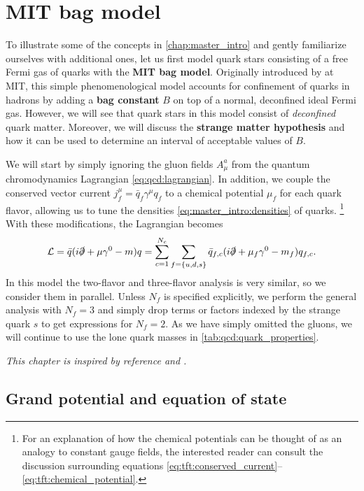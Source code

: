 \chapter{MIT bag model}
\label{chap:mit}

To illustrate some of the concepts in \cref{chap:master_intro} and gently familiarize ourselves with additional ones,
let us first model quark stars consisting of a free Fermi gas of quarks with the \textbf{MIT bag model}.
Originally introduced by \cite{ref:mit_bag_model_original} at MIT,
this simple phenomenological model accounts for confinement of quarks in hadrons by adding a \textbf{bag constant} $B$ on top of a normal, deconfined ideal Fermi gas.
However, we will see that quark stars in this model consist of \emph{deconfined} quark matter.
Moreover, we will discuss the \textbf{strange matter hypothesis} and how it can be used to determine an interval of acceptable values of $B$.

We will start by simply ignoring the gluon fields $A_\mu^a$ from the quantum chromodynamics Lagrangian \eqref{eq:qcd:lagrangian}.
In addition, we couple the conserved vector current $j^\mu_f = \bar{q}_f \gamma^\mu q_f$ to a chemical potential $\mu_f$ for each quark flavor,
allowing us to tune the densities \eqref{eq:master_intro:densities} of quarks.%
\footnote{For an explanation of how the chemical potentials can be thought of as an analogy to constant gauge fields,
the interested reader can consult the discussion surrounding equations \eqref{eq:tft:conserved_current}--\eqref{eq:tft:chemical_potential}.}
With these modifications, the Lagrangian becomes
\begin{equation}
	\mathcal{L} = \bar{q} (i \slashed\partial + \mu \gamma^0 - m) q
	      = \sum_{c=1}^{N_c} \sum_{f=\{u,d,s\}} \bar{q}_{f,c} (i \slashed\partial + \mu_f \gamma^0 - m_f) q_{f,c} .
\label{eq:mit:lagrangian}
\end{equation}
In this model the two-flavor and three-flavor analysis is very similar, so we consider them in parallel.
Unless $N_f$ is specified explicitly, we perform the general analysis with $N_f=3$
and simply drop terms or factors indexed by the strange quark $s$ to get expressions for $N_f = 2$.
As we have simply omitted the gluons, we will continue to use the lone quark masses in \cref{tab:qcd:quark_properties}.

\textit{This chapter is inspired by reference \cite{ref:glendenning} and \cite{ref:quark_bag_model}.}

\section{Grand potential and equation of state}
\label{sec:mit:eos}

